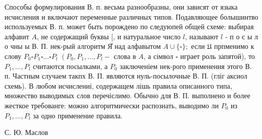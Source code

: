\documentclass[10pt]{article}
\begin{document}
Способы формулирования В. п. весьма разнообразны, они зависят от языка исчисления и включают переменные различных типов. Подавляющее болышинтво используемых В. п. может быть порождено по следуюпей общей схеме: выбирая алфавит $A$, не содержащий буквы $[$, и натуральное число $l$, называют $l$ - п о с ы л о чны ы В. П. нек-рый алгоритм Я̊ над алфавытом $A \cup\{\square\} ;$ если $\mathfrak{U}$ прпменимо к слову $P_{0} \square P_{1} \square \ldots \square P_{l}$ $\left(P_{0}, P_{1}, \ldots, P_{l}-\right.$ слова в $A$, а сімвол $\square$ играет роль запятой), то $P_{1}, \ldots, P_{l}$ считаются посылками, а $P_{0}$ заключеніем нек-рого применения этого В. п. Частным случаем такпх В. П. являются нуль-посылочные В. П. (гліг аксиол схемь). В любом исчислениі, содержащем лішь правила описанного типа, множество выводимых слов перечіслимо. Обычно для В. П. выполнено и более жесткое требованге: можно алгоритмически распознать, выводимо ли $P_{0}$ из $P_{1}, \ldots, P_{l}$ за одно применение правила.



С. Ю. Маслов
\end{document}
